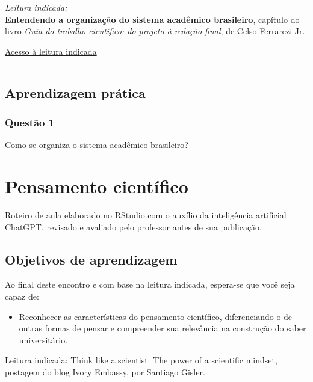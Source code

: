 \documentclass[
  letterpaper,
  DIV=11,
  numbers=noendperiod]{scrreprt}
\providecommand{\tightlist}{%
  \setlength{\itemsep}{0pt}\setlength{\parskip}{0pt}}
\begin{document}
\emph{Leitura indicada:}\\
\textbf{Entendendo a organização do sistema acadêmico brasileiro},
capítulo do livro \emph{Guia do trabalho científico: do projeto à
redação final}, de Celso Ferrarezi Jr.

\href{vbk://9788572447638/epubcfi/6/14\%5B\%3Bvnd.vst.idref\%3Dcap1.xhtml\%5D}{Acesso
à leitura indicada}

\begin{center}\rule{0.5\linewidth}{0.5pt}\end{center}

\section{Aprendizagem prática}\label{aprendizagem-pruxe1tica}

\subsection{Questão 1}\label{questuxe3o-1}

Como se organiza o sistema acadêmico brasileiro?

\chapter{Pensamento científico}\label{pensamento-cientuxedfico}

Roteiro de aula elaborado no RStudio com o auxílio da inteligência
artificial ChatGPT, revisado e avaliado pelo professor antes de sua
publicação.

\section{Objetivos de aprendizagem}\label{objetivos-de-aprendizagem}

Ao final deste encontro e com base na leitura indicada, espera-se que
você seja capaz de:

\begin{itemize}
\tightlist
\item
  Reconhecer as características do pensamento científico,
  diferenciando-o de outras formas de pensar e compreender sua
  relevância na construção do saber universitário.
\end{itemize}

Leitura indicada: Think like a scientist: The power of a scientific
mindset, postagem do blog Ivory Embassy, por Santiago Gisler.
\end{document}
